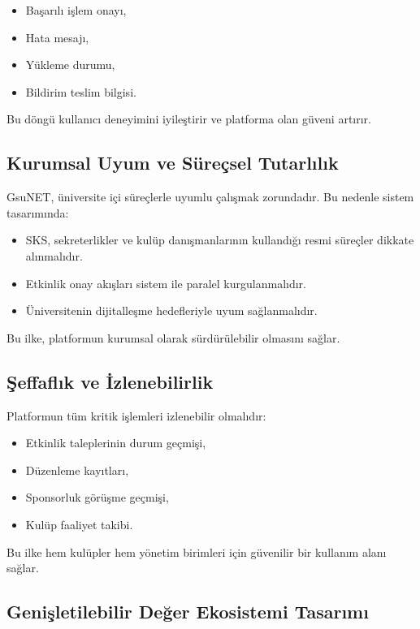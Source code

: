 \documentclass[a4paper,12pt]{report}
\begin{document}
\begin{itemize}
    \item Başarılı işlem onayı,
    \item Hata mesajı,
    \item Yükleme durumu,
    \item Bildirim teslim bilgisi.
\end{itemize}

Bu döngü kullanıcı deneyimini iyileştirir ve platforma olan güveni artırır.

\subsection{Kurumsal Uyum ve Süreçsel Tutarlılık}

GsuNET, üniversite içi süreçlerle uyumlu çalışmak zorundadır. Bu nedenle sistem tasarımında:

\begin{itemize}
    \item SKS, sekreterlikler ve kulüp danışmanlarının kullandığı resmi süreçler dikkate alınmalıdır.
    \item Etkinlik onay akışları sistem ile paralel kurgulanmalıdır.
    \item Üniversitenin dijitalleşme hedefleriyle uyum sağlanmalıdır.
\end{itemize}

Bu ilke, platformun kurumsal olarak sürdürülebilir olmasını sağlar.

\subsection{Şeffaflık ve İzlenebilirlik}

Platformun tüm kritik işlemleri izlenebilir olmalıdır:

\begin{itemize}
    \item Etkinlik taleplerinin durum geçmişi,
    \item Düzenleme kayıtları,
    \item Sponsorluk görüşme geçmişi,
    \item Kulüp faaliyet takibi.
\end{itemize}

Bu ilke hem kulüpler hem yönetim birimleri için güvenilir bir kullanım alanı sağlar.

\subsection{Genişletilebilir Değer Ekosistemi Tasarımı}
\end{document}
